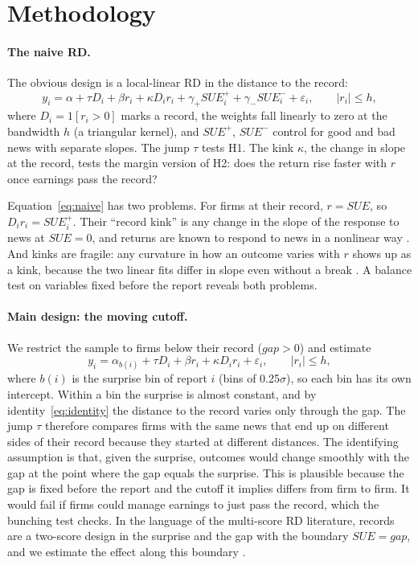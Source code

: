 \documentclass[11pt]{article}
\newcommand{\SUE}{\mathit{SUE}}
\newcommand{\gap}{\mathit{gap}}
\begin{document}
\section{Methodology}

\paragraph{The naive RD.} The obvious design is a local-linear RD in the distance to the record:
\begin{equation}
y_i = \alpha + \tau D_i + \beta r_i + \kappa D_i r_i + \gamma_{+}\SUE_i^{+} + \gamma_{-}\SUE_i^{-} + \varepsilon_i,
\qquad |r_i|\leq h,
\label{eq:naive}
\end{equation}
where $D_i=1[r_i>0]$ marks a record, the weights fall linearly to zero at the bandwidth $h$ (a triangular kernel), and
$\SUE^{+}$, $\SUE^{-}$ control for good and bad news with separate slopes. The jump $\tau$ tests H1. The kink $\kappa$,
the change in slope at the record, tests the margin version of H2: does the return rise faster with $r$ once earnings
pass the record?

Equation~\eqref{eq:naive} has two problems. For firms at their record, $r=\SUE$, so $D_i r_i=\SUE_i^{+}$. Their
``record kink'' is any change in the slope of the response to news at $\SUE=0$, and returns are known to respond to
news in a nonlinear way \citep{freeman1992}. And kinks are fragile: any curvature in how an outcome varies with $r$
shows up as a kink, because the two linear fits differ in slope even without a break \citep{card2015}. A balance test
on variables fixed before the report reveals both problems.

\paragraph{Main design: the moving cutoff.} We restrict the sample to firms below their record ($\gap>0$) and estimate
\begin{equation}
y_i = \alpha_{b(i)} + \tau D_i + \beta r_i + \kappa D_i r_i + \varepsilon_i,\qquad |r_i|\leq h,
\label{eq:main}
\end{equation}
where $b(i)$ is the surprise bin of report $i$ (bins of 0.25$\sigma$), so each bin has its own intercept. Within a bin
the surprise is almost constant, and by identity~\eqref{eq:identity} the distance to the record varies only through
the gap. The jump $\tau$ therefore compares firms with the same news that end up on different sides of their record
because they started at different distances. The identifying assumption is that, given the surprise, outcomes would
change smoothly with the gap at the point where the gap equals the surprise. This is plausible because the gap is fixed
before the report and the cutoff it implies differs from firm to firm. It would fail if firms could manage earnings to
just pass the record, which the bunching test checks. In the language of the multi-score RD literature, records are
a two-score design in the surprise and the gap with the boundary $\SUE=\gap$, and we estimate the effect along this
boundary \citep{papay2011,reardon2012,wong2013}.
\end{document}
